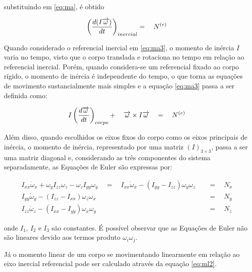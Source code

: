 \documentclass[a4paper, 12pt]{article}
\begin{document}
\noindent substituindo em \ref{eq:ma}, é obtido 

\begin{equation}
\centering
{ \left( \frac { d(I\overrightarrow { \omega  } ) }{ dt }  \right)  }_{ inercial }=\quad { N }^{ (e) }
\label{eq:ma3}
\end{equation}

Quando considerado o referencial inercial em \ref{eq:ma3}, o momento de inércia $I$ varia no tempo, visto que o corpo translada e rotaciona no tempo em relação ao referencial inercial. Porém, quando considera-se um referencial fixado ao corpo rígido, o momento de inércia é independente do tempo, o que torna as equações de movimento sustancialmente mais simples e a equação \ref{eq:ma3} passa a ser definida como:

\begin{equation}
\centering
{ I\left( \frac { d\overrightarrow { \omega  }  }{ dt }  \right)  }_{ corpo }+\quad \overrightarrow { \omega  } \times I\overrightarrow { \omega  } \quad =\quad { N }^{ (e) }
\label{eq:ma4}
\end{equation}

Além disso, quando escolhidos os eixos fixos do corpo como os eixos principais de inércia, o momento de inércia, representado por uma matriz $(I)_{3\times3}$, passa a ser uma matriz diagonal e, considerando as três componentes do sistema separadamente, as Equações de Euler são expressas por:


\begin{equation}
\begin{aligned}
{ I }_{ xx }{ \dot { \omega  }  }_{ x }+{ \omega  }_{ y }I_{ zz }\omega _{ z }-\omega _{ z }I_{ yy }\omega _{ y }\quad =\quad { I }_{ xx }{ \dot { \omega  }  }_{ x } - (I_{ yy } - I_{ zz }){ \omega  }_{ y }{ \omega  }_{ z }\quad &=\quad N_{ x } \\
{ I }_{ yy }{ \dot { \omega  }  }_{ y } - (I_{ zz } - I_{ xx }){ \omega  }_{ z }{ \omega  }_{ x }\quad &=\quad N_{ y }\\
{ I }_{ zz }{ \dot { \omega  }  }_{ z } - (I_{ xx } - I_{ yy }){ \omega  }_{ x }{ \omega  }_{ y }\quad &=\quad N_{ z }
\end{aligned}
\label{eq:eulers}
\end{equation}

\noindent onde $I_1$, $I_2$ e $I_3$ são constantes. É possível observar que as Equações de Euler não são lineares devido aos termos produto $\omega_i\omega_j$. 

Já o momento linear de um corpo se movimentando linearmente em relação ao eixo inercial referencial pode ser calculado através da equação \ref{eq:ml2}.
\end{document}
